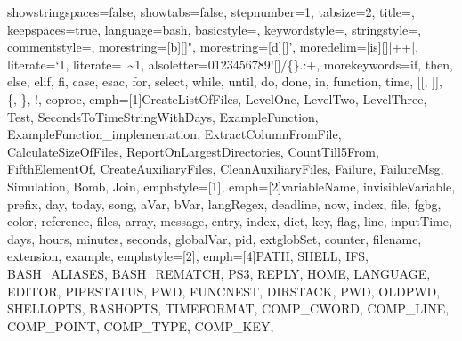 {showstringspaces=false,             %
showtabs=false,                     %
stepnumber=1,                       %
tabsize=2,                          %
title=\lstname,                     %
%
keepspaces=true,                    %
language=bash,
basicstyle=\ttfamily\scriptsize\color{basic-color},
keywordstyle=\color{keywords-color},
stringstyle=\color{strings-color},
commentstyle=\color{comment-color},
morestring=[b][\color{strings-color}]{"},
morestring=[d][\color{strings-color}]{'},
moredelim=[is][\color{basic-color}]{|+}{+|}, %
literate={`}{\textasciigrave}1, %
literate={~}{{\textasciitilde}}1,
alsoletter=0123456789![]/\{\}.:+, %
morekeywords={if, then, else, elif, fi, case, esac, for, select, while, until, do, done, in, function, time, [[, ]], \{, \}, !, coproc}, %
emph=[1]{CreateListOfFiles, LevelOne, LevelTwo, LevelThree, Test, SecondsToTimeStringWithDays, ExampleFunction,
         ExampleFunction_implementation, ExtractColumnFromFile, CalculateSizeOfFiles, ReportOnLargestDirectories,
         CountTill5From, FifthElementOf, CreateAuxiliaryFiles, CleanAuxiliaryFiles, Failure, FailureMsg, Simulation, Bomb, Join},
emphstyle=[1]{\color{functions-color}}, %
emph=[2]{variableName, invisibleVariable, prefix, day, today, song, aVar, bVar, langRegex, deadline, now,
         index, file, fgbg, color, reference, files, array, message, entry, index, dict, key, flag, line, inputTime,
         days, hours, minutes, seconds, globalVar, pid, extglobSet, counter, filename, extension, example},
emphstyle=[2]{\color{variables-color}}, %
emph=[4]{PATH, SHELL, IFS, BASH_ALIASES, BASH_REMATCH, PS3, REPLY, HOME, LANGUAGE, EDITOR, PIPESTATUS, PWD, FUNCNEST,
         DIRSTACK, PWD, OLDPWD, SHELLOPTS, BASHOPTS, TIMEFORMAT, COMP_CWORD, COMP_LINE, COMP_POINT, COMP_TYPE, COMP_KEY,
}}
